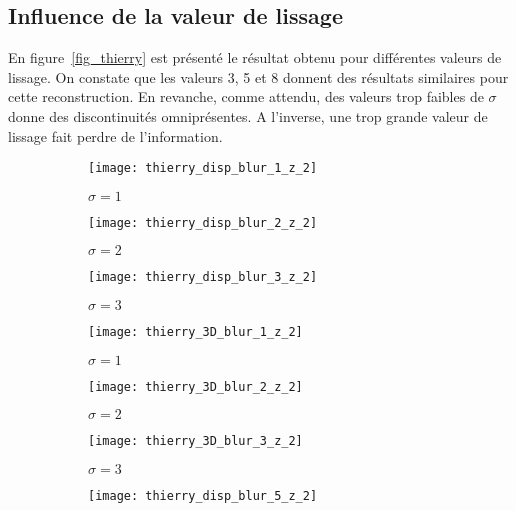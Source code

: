 \documentclass[12pt,a4paper,onecolumn]{article}
\begin{document}
\subsection{Influence de la valeur de lissage}

En figure~\ref{fig_thierry} est présenté le résultat obtenu pour différentes valeurs de lissage. On constate que les valeurs 3, 5 et 8 donnent des résultats similaires pour cette reconstruction. En revanche, comme attendu, des valeurs trop faibles de \(\sigma\) donne des discontinuités omniprésentes. A l'inverse, une trop grande valeur de lissage fait perdre de l'information.

\begin{figure}[H]
	\centering
	\begin{subfigure}[b]{0.3\textwidth}
		\centering
		\texttt{[image: thierry\_disp\_blur\_1\_z\_2]}
		\caption{\(\sigma = 1\)}
		\label{fig_thierry_disp_1}
	\end{subfigure}
	\hfill
	\begin{subfigure}[b]{0.3\textwidth}
		\centering
		\texttt{[image: thierry\_disp\_blur\_2\_z\_2]}
		\caption{\(\sigma = 2\)}
		\label{fig_thierry_disp_2}
	\end{subfigure}
	\hfill
	\begin{subfigure}[b]{0.3\textwidth}
		\centering
		\texttt{[image: thierry\_disp\_blur\_3\_z\_2]}
		\caption{\(\sigma = 3\)}
		\label{fig_thierry_disp_3}
	\end{subfigure}
	\hfill
	\begin{subfigure}[b]{0.3\textwidth}
		\centering
		\texttt{[image: thierry\_3D\_blur\_1\_z\_2]}
		\caption{\(\sigma = 1\)}
		\label{fig_thierry_3D_1}
	\end{subfigure}
	\hfill
	\begin{subfigure}[b]{0.3\textwidth}
		\centering
		\texttt{[image: thierry\_3D\_blur\_2\_z\_2]}
		\caption{\(\sigma = 2\)}
		\label{fig_thierry_3D_1}
	\end{subfigure}
	\hfill
	\begin{subfigure}[b]{0.3\textwidth}
		\centering
		\texttt{[image: thierry\_3D\_blur\_3\_z\_2]}
		\caption{\(\sigma = 3\)}
		\label{fig_thierry_3D_1}
	\end{subfigure}
	\hfill
	\begin{subfigure}[b]{0.3\textwidth}
		\centering
		\texttt{[image: thierry\_disp\_blur\_5\_z\_2]}

\end{subfigure}
\end{figure}
\end{document}
